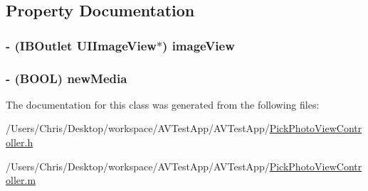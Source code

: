\subsection{\-Property \-Documentation}
\hypertarget{interface_pick_photo_view_controller_a8c4523596388c339de4b0bde905c97b2}{
\subsubsection[{image\-View}]{\setlength{\rightskip}{0pt plus 5cm}-\/ (\-I\-B\-Outlet \-U\-I\-Image\-View$\ast$) {\bf image\-View}}}\label{interface_pick_photo_view_controller_a8c4523596388c339de4b0bde905c97b2}
\hypertarget{interface_pick_photo_view_controller_a4bca79b4b22834aa3cf000b9a4213517}{
\subsubsection[{new\-Media}]{\setlength{\rightskip}{0pt plus 5cm}-\/ (\-B\-O\-O\-L) {\bf new\-Media}}}\label{interface_pick_photo_view_controller_a4bca79b4b22834aa3cf000b9a4213517}


\-The documentation for this class was generated from the following files\-:\begin{DoxyCompactItemize}
\item 
/\-Users/\-Chris/\-Desktop/workspace/\-A\-V\-Test\-App/\-A\-V\-Test\-App/\hyperlink{_pick_photo_view_controller_8h}{\-Pick\-Photo\-View\-Controller.\-h}\item 
/\-Users/\-Chris/\-Desktop/workspace/\-A\-V\-Test\-App/\-A\-V\-Test\-App/\hyperlink{_pick_photo_view_controller_8m}{\-Pick\-Photo\-View\-Controller.\-m}\end{DoxyCompactItemize}
